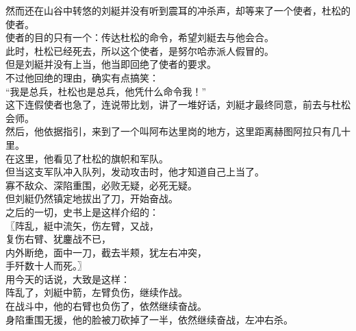 \begin{multicols}{\theparacolNo}
然而还在山谷中转悠的刘綎并没有听到震耳的冲杀声，却等来了一个使者，杜松的使者。\\

使者的目的只有一个：传达杜松的命令，希望刘綎去与他会合。\\

此时，杜松已经死去，所以这个使者，是努尔哈赤派人假冒的。\\

但是刘綎并没有上当，他当即回绝了使者的要求。\\

不过他回绝的理由，确实有点搞笑：\\

“我是总兵，杜松也是总兵，他凭什么命令我！”\\

这下连假使者也急了，连说带比划，讲了一堆好话，刘綎才最终同意，前去与杜松会师。\\

然后，他依据指引，来到了一个叫阿布达里岗的地方，这里距离赫图阿拉只有几十里。\\

在这里，他看见了杜松的旗帜和军队。\\

但当这支军队冲入队列，发动攻击时，他才知道自己上当了。\\

寡不敌众、深陷重围，必败无疑，必死无疑。\\

但刘綎仍然镇定地拔出了刀，开始奋战。\\

之后的一切，史书上是这样介绍的：\\

〖阵乱，綎中流矢，伤左臂，又战，\\

复伤右臂、犹鏖战不已，\\

内外断绝，面中一刀，截去半颊，犹左右冲突，\\

手歼数十人而死。〗\\

用今天的话说，大致是这样：\\

阵乱了，刘綎中箭，左臂负伤，继续作战。\\

在战斗中，他的右臂也负伤了，依然继续奋战。\\

身陷重围无援，他的脸被刀砍掉了一半，依然继续奋战，左冲右杀。\\


\end{multicols}
